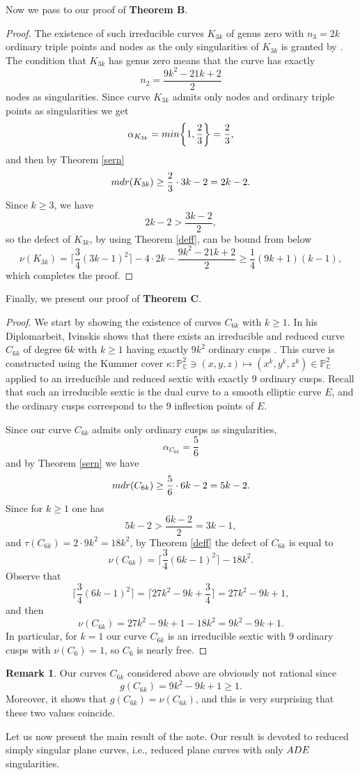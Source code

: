 \documentclass[12pt]{article}
\theoremstyle{plain}
\theoremstyle{definition}
\newtheorem{remark}[thm]{Remark}
\begin{document}
Now we pass to our proof of \textbf{Theorem B}.
\begin{proof}
The existence of such irreducible curves $K_{3k}$ of genus zero with $n_{3} = 2k$ ordinary triple points and nodes as the only singularities of $K_{3k}$ is granted by \cite[3.4 Theorem]{GM}. The condition that $K_{3k}$ has genus zero means that the curve has exactly 
$$n_{2} = \frac{9k^2 - 21k + 2}{2}$$
nodes as singularities.
Since curve $K_{3k}$ admits only nodes and ordinary triple points as singularities we get
$$\alpha_{K_{3k}} = {\rm min} \bigg\{1, \frac{2}{3}\bigg\} = \frac{2}{3},$$
 and then by Theorem \ref{sern}
$${\rm mdr}(K_{3k}) \geq \frac{2}{3}\cdot 3k-2 = 2k-2.$$
Since $k\geq 3$, we have
$$2k-2 > \frac{3k-2}{2},$$
so the defect of $K_{3k}$, by using Theorem \ref{deff}, can be bound from below
$$\nu(K_{3k}) =  \bigg\lceil\frac{3}{4}(3k-1)^{2}\bigg\rceil - 4 \cdot 2k - \frac{9k^2 - 21k + 2}{2} \geq \frac{1}{4}(9k+1)(k-1),$$
which completes the proof.
\end{proof}
Finally, we present our proof of \textbf{Theorem C}.
\begin{proof}
 We start by showing the existence of curves $C_{6k}$ with $k \geq 1$. In his Diplomarbeit, Ivinskis shows that there exists an irreducible and reduced curve $C_{6k}$ of degree $6k$ with $k\geq 1$ having exactly $9k^{2}$ ordinary cusps \cite[Lemma~4.1.7]{Ivinskis}. This curve is constructed using the Kummer cover $\kappa: \mathbb{P}^{2}_{\mathbb{C}} \ni (x,y,z) \mapsto (x^{k},y^{k},z^{k}) \in \mathbb{P}^{2}_{\mathbb{C}}$ applied to an irreducible and reduced sextic with exactly $9$ ordinary cusps. Recall that such an irreducible sextic is the dual curve to a smooth elliptic curve $E$, and the ordinary cusps correspond to the $9$ inflection points of $E$.

 
 Since our curve $C_{6k}$ admits only ordinary cusps as singularities,
 $$\alpha_{C_{6k}} = \frac{5}{6}$$
 and by Theorem \ref{sern} we have
 $${\rm mdr}(C_{6k}) \geq \frac{5}{6}\cdot 6k - 2 = 5k-2.$$
 Since for $k\geq 1$ one has
 $$5k-2 > \frac{6k-2}{2} = 3k - 1,$$
 and $\tau(C_{6k}) = 2\cdot 9k^{2} = 18k^{2}$, by Theorem \ref{deff}
 the defect of $C_{6k}$ is equal to
 $$\nu(C_{6k}) =  \bigg\lceil\frac{3}{4}(6k-1)^{2}\bigg\rceil - 18k^{2}.$$
 Observe that
 $$\bigg\lceil\frac{3}{4}(6k-1)^{2}\bigg\rceil = \bigg\lceil 27k^2 -9k +\frac{3}{4}\bigg\rceil = 27k^{2}-9k+1,$$
 and then
 $$\nu(C_{6k}) = 27k^{2}-9k+1 - 18k^2 = 9k^{2}-9k+1.$$
 In particular, for $k=1$ our curve $C_{6k}$ is an irreducible sextic with $9$ ordinary cusps with $\nu(C_{6})=1$, so $C_{6}$ is nearly free.
\end{proof}
\begin{remark}
Our curves $C_{6k}$ considered above are obviously not rational since
$$g(C_{6k}) = 9k^2 - 9k+1 \geq 1.$$
Moreover, it shows that $g(C_{6k}) = \nu(C_{6k})$, and this is very surprising that these two values coincide.
\end{remark}
Let us now present the main result of the note. Our result is devoted to reduced simply singular plane curves, i.e., reduced plane curves with only ${\rm ADE}$ singularities.
\end{document}
